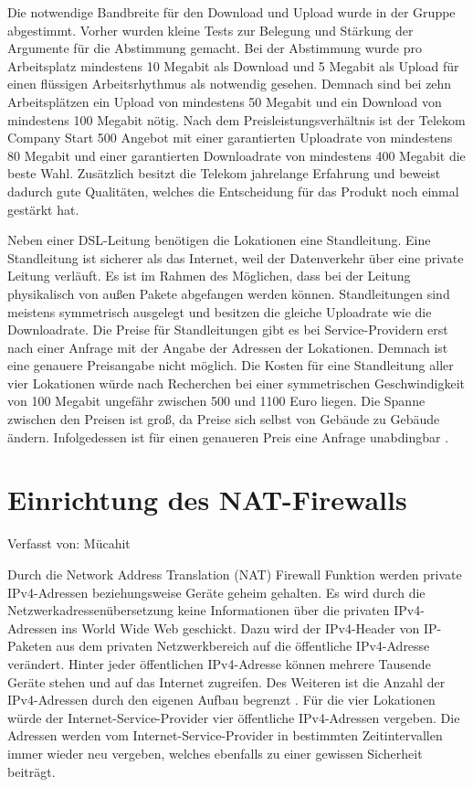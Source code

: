 \documentclass[fontsize=12pt,paper=a4,open=any,parskip=half,
  twoside=false,toc=listof,toc=bibliography,fleqn,leqno,
  captions=nooneline,captions=tableabove,british]{scrbook}
\begin{document}
\newpage
Die notwendige Bandbreite für den Download und Upload wurde in der Gruppe abgestimmt. Vorher wurden kleine Tests zur Belegung und Stärkung der Argumente für die Abstimmung gemacht. Bei der Abstimmung wurde pro Arbeitsplatz mindestens 10 Megabit als Download und 5 Megabit als Upload für einen flüssigen Arbeitsrhythmus als notwendig gesehen. Demnach sind bei zehn Arbeitsplätzen ein Upload von mindestens 50 Megabit und ein Download von mindestens 100 Megabit nötig. Nach dem Preisleistungsverhältnis ist der Telekom Company Start 500 \cite{companystart} Angebot mit einer garantierten Uploadrate von mindestens 80 Megabit und einer garantierten Downloadrate von mindestens 400 Megabit die beste Wahl. Zusätzlich besitzt die Telekom jahrelange Erfahrung und beweist dadurch gute Qualitäten, welches die Entscheidung für das Produkt noch einmal gestärkt hat.\par
Neben einer DSL-Leitung benötigen die Lokationen eine Standleitung. Eine Standleitung ist sicherer als das Internet, weil der Datenverkehr über eine private Leitung verläuft. Es ist im Rahmen des Möglichen, dass bei der Leitung physikalisch von außen Pakete abgefangen werden können. Standleitungen sind meistens symmetrisch ausgelegt und besitzen die gleiche Uploadrate wie die Downloadrate. Die Preise für Standleitungen gibt es bei Service-Providern erst nach einer Anfrage mit der Angabe der Adressen der Lokationen. Demnach ist eine genauere Preisangabe nicht möglich. Die Kosten für eine Standleitung aller vier Lokationen würde nach Recherchen bei einer symmetrischen Geschwindigkeit von 100 Megabit ungefähr zwischen 500 und 1100 Euro liegen. Die Spanne zwischen den Preisen ist groß, da Preise sich selbst von Gebäude zu Gebäude ändern. Infolgedessen ist für einen genaueren Preis eine Anfrage unabdingbar \cite{standleitung}.

\newpage
\section{Einrichtung des NAT-Firewalls}
{\tiny Verfasst von: Mücahit\par}
Durch die Network Address Translation (NAT) Firewall Funktion werden private IPv4-Adressen beziehungsweise Geräte geheim gehalten. Es wird durch die Netzwerkadressenübersetzung keine Informationen über die privaten IPv4-Adressen ins World Wide Web geschickt. Dazu wird der IPv4-Header von IP-Paketen aus dem privaten Netzwerkbereich auf die öffentliche IPv4-Adresse verändert. Hinter jeder öffentlichen IPv4-Adresse können mehrere Tausende Geräte stehen und auf das Internet zugreifen. Des Weiteren ist die Anzahl der IPv4-Adressen durch den eigenen Aufbau begrenzt \cite{NATdef}. Für die vier Lokationen würde der Internet-Service-Provider vier öffentliche IPv4-Adressen vergeben. Die Adressen werden vom Internet-Service-Provider in bestimmten Zeitintervallen immer wieder neu vergeben, welches ebenfalls zu einer gewissen Sicherheit beiträgt.
\end{document}
